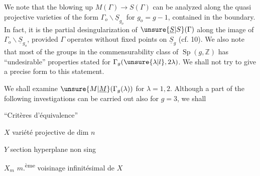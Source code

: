 We note that the blowing up $M(\Gamma)\longrightarrow S(\Gamma)$ can be analyzed along the quasi projective varieties of the form $\Gamma_{o}\backslash\underline S_{g_{o}}$ for $g_{o}=g-1$, contained in the boundary. In fact, it is the partial desingularization of $\unsure{\underline S|S}(\Gamma)$ along the image of $\Gamma_{o}\backslash\underline S_{g_{o}}$, provided $\Gamma$ operates without fixed points on $\underline S_{g}$ (cf. 10). We also note that most of the groups in the commensurability class of $\operatorname{Sp}(g,\mathbb Z)$ has ``undesirable'' properties stated for $\Gamma_{g}(\unsure{\lambda|l},2\lambda)$. We shall not try to give a precise form to this statement.

We shall examine $\unsure{M|\underline M}(\Gamma_{g}(\lambda))$ for $\lambda=1,2$. Although a part of the following investigations can be carried out also for $g=3$, we shall


``Critères d'équivalence''


\begin{center}\end{center}

$X$ variété projective  de dim $n$

$Y$ section hyperplane  non sing

$X_{m}$ $m$.\textsuperscript{ème} voisinage infinitésimal de $X$


